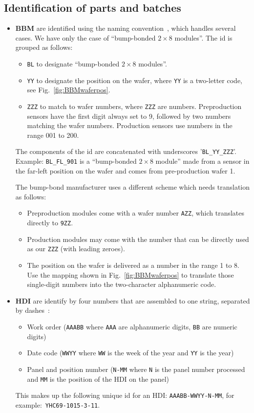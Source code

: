 \documentclass[12pt]{unlsilabsop}
\begin{document}
\subsection{Identification of parts and batches}
\begin{itemize}
    \item \textbf{BBM} are identified using the naming convention~\cite{BBMnaming}, which handles several cases. We have only the case of ``bump-bonded $2\times8$ modules''. The id is grouped as follows:
        \begin{itemize}
        \item \texttt{BL} to designate ``bump-bonded $2\times8$ modules''.
        \item \texttt{YY} to designate the position on the wafer, where \texttt{YY} is a two-letter code, see Fig.~\ref{fig:BBMwaferpos}.
        \item \texttt{ZZZ} to match to wafer numbers, where \texttt{ZZZ} are numbers. Preproduction sensors have the first digit always set to 9, followed by two numbers matching the wafer numbers. Production sensors use numbers in the range 001 to 200.
        \end{itemize}
    The components of the id are concatenated with underscores '\texttt{BL\_YY\_ZZZ}'.
    Example: \texttt{BL\_FL\_901} is a ``bump-bonded $2\times8$ module'' made from a sensor in the far-left position on the wafer and comes from pre-production wafer 1.

    The bump-bond manufacturer uses a different scheme which needs translation as follows:
        \begin{itemize}
        \item Preproduction modules come with a wafer number \texttt{AZZ}, which translates directly to \texttt{9ZZ}.
        \item Production modules may come with the number that can be directly used as our \texttt{ZZZ} (with leading zeroes).
        \item The position on the wafer is delivered as a number in the range 1 to 8. Use the mapping shown in Fig.~\ref{fig:BBMwaferpos} to translate those single-digit numbers into the two-character alphanumeric code.
        \end{itemize}

    \item \textbf{HDI} are identify by four numbers that are assembled to one string, separated by dashes~\cite{HDInaming}:
        \begin{itemize}
        \item Work order (\texttt{AAABB} where \texttt{AAA} are alphanumeric digits, \texttt{BB} are numeric digits)
        \item Date code (\texttt{WWYY} where \texttt{WW} is the week of the year and \texttt{YY} is the year)
        \item Panel and position number (\texttt{N-MM} where \texttt{N} is the panel number processed and \texttt{MM} is the position of the HDI on the panel)
        \end{itemize}
    This makes up the following unique id for an HDI: \texttt{AAABB-WWYY-N-MM}, for example:~\texttt{YHC69-1015-3-11}.


\end{itemize}
\end{document}
